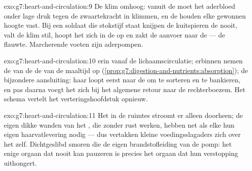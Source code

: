 \begin{solution}{exo:g7:heart-and-circulation:9}
De klim omhoog: vanuit de  moet het aderbloed onder lage druk tegen
de zwaartekracht in klimmen, en de  houden elke gewonnen hoogte
vast. Bij een soldaat die stokstijf staat knijpen de kuitspieren de 
nooit, valt de klim stil, hoopt het  zich in de  op en zakt de
aanvoer naar de  --- de flauwte. Marcherende voeten zijn
aderpompen.
\end{solution}

\begin{solution}{exo:g7:heart-and-circulation:10}
 erin vanaf de lichaamscirculatie; erbinnen nemen de 
van de  de  van de maaltijd op
(\cref{prop:g7:digestion-and-nutrients:absorption}); de bijzondere
aansluiting: haar  loopt eerst naar de  om te sorteren en te
bankieren, en pas daarna voegt het  zich bij het algemene retour naar
de rechterboezem. Het schema vertelt het verteringshoofdstuk opnieuw.
\end{solution}

\begin{solution}{exo:g7:heart-and-circulation:11}
Het  in de ruimtes stroomt er alleen doorheen; de eigen dikke wanden
van het , die zonder rust werken, hebben net als elke  hun eigen
haarvatlevering nodig --- dus vertakken kleine voedingsslagaders zich over
het  zelf. Dichtgeslibd smoren die de eigen brandstofleiding van de
pomp: het enige orgaan dat nooit kan pauzeren is precies het orgaan dat
hun verstopping uithongert.
\end{solution}

